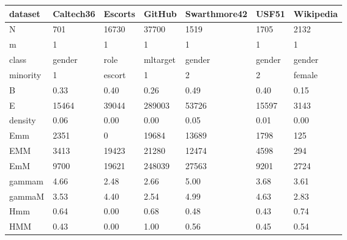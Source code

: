 \begin{tabular}{lllllll}
\toprule
dataset & Caltech36 & Escorts &    GitHub & Swarthmore42 &   USF51 & Wikipedia \\
\midrule
N        &       701 &   16730 &     37700 &         1519 &    1705 &      2132 \\
m        &         1 &       1 &         1 &            1 &       1 &         1 \\
class    &    gender &    role &  mltarget &       gender &  gender &    gender \\
minority &         1 &  escort &         1 &            2 &       2 &    female \\
B        &      0.33 &    0.40 &      0.26 &         0.49 &    0.40 &      0.15 \\
E        &     15464 &   39044 &    289003 &        53726 &   15597 &      3143 \\
density  &      0.06 &    0.00 &      0.00 &         0.05 &    0.01 &      0.00 \\
Emm      &      2351 &       0 &     19684 &        13689 &    1798 &       125 \\
EMM      &      3413 &   19423 &     21280 &        12474 &    4598 &       294 \\
EmM      &      9700 &   19621 &    248039 &        27563 &    9201 &      2724 \\
gammam   &      4.66 &    2.48 &      2.66 &         5.00 &    3.68 &      3.61 \\
gammaM   &      3.53 &    4.40 &      2.54 &         4.99 &    4.63 &      2.83 \\
Hmm      &      0.64 &    0.00 &      0.68 &         0.48 &    0.43 &      0.74 \\
HMM      &      0.43 &    0.00 &      1.00 &         0.56 &    0.45 &      0.54 \\
\bottomrule
\end{tabular}
